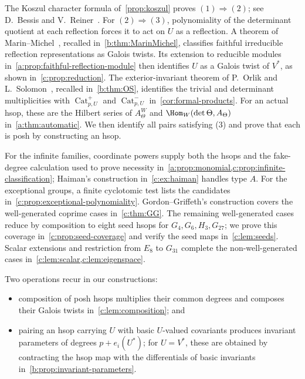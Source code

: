 \documentclass[10pt,a4paper]{amsart}
\DeclareMathOperator{\Cat}{Cat}
\theoremstyle{definition}
\begin{document}
The Koszul character formula of~\cref{prop:koszul} proves
$(1)\Rightarrow(2)$; see D.~Bessis and V.~Reiner~\cite[Proposition~4.2 and its proof]{BR}.
For $(2)\Rightarrow(3)$, polynomiality of the determinant quotient
at each reflection forces it to act on $U$ as a reflection.
A theorem of Marin--Michel~\cite[Theorem~1.2]{MarinMichel}, recalled
in~\cref{b:thm:MarinMichel}, classifies faithful irreducible reflection
representations as Galois twists. Its extension to reducible modules
in~\cref{a:prop:faithful-reflection-module} then identifies $U$ as a
Galois twist of $V^*$, as shown in~\cref{c:prop:reduction}.
The exterior-invariant theorem of P.~Orlik and L.~Solomon~\cite[Theorem~3.1]{OS},
recalled in~\cref{b:thm:OS}, identifies the trivial and determinant
multiplicities with $\Cat^+_{p,U}$ and $\Cat^-_{p,U}$
in~\cref{cor:formal-products}. For an actual hsop, these are the
Hilbert series of $A_\Theta^W$ and $\Hom_W(\det\Theta,A_\Theta)$
in~\cref{a:thm:automatic}.
We then identify all pairs satisfying (3) and prove that each is posh
by constructing an hsop.

For the infinite families, coordinate powers supply both the hsops
and the fake-degree calculation used to prove necessity
in~\cref{a:prop:monomial,c:prop:infinite-classification}; Haiman's
construction in~\cref{c:ex:haiman} handles type $A$.
For the exceptional groups, a finite cyclotomic test lists the
candidates in~\cref{c:prop:exceptional-polynomiality}.
Gordon--Griffeth's construction covers the well-generated coprime
cases in~\cref{c:thm:GG}. The remaining well-generated cases reduce
by composition to eight seed hsops for $G_4,G_6,H_3,G_{27}$;
we prove this coverage in~\cref{c:prop:seed-coverage} and verify
the seed maps in~\cref{c:lem:seeds}.
Scalar extensions and restriction from $E_8$ to $G_{31}$ complete
the non-well-generated cases in~\cref{c:lem:scalar,c:lem:eigenspace}.

Two operations recur in our constructions:
\begin{itemize}
\item composition of posh hsops multiplies their common degrees and
composes their Galois twists in~\cref{c:lem:composition}; and
\item pairing an hsop carrying $U$ with basic $U$-valued covariants
produces invariant parameters of degrees $p+e_i(U^*)$;
for $U=V^*$, these are obtained by contracting the hsop map with
the differentials of basic invariants in~\cref{b:prop:invariant-parameters}.
\end{itemize}
\end{document}
